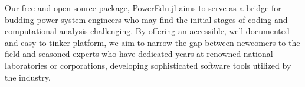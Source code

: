 \documentclass[varwidth]{standalone}
\providecommand{\packageName}[1]{PowerEdu.jl}
\begin{document}
Our free and open-source package, \packageName{} aims to serve as a
bridge for budding power system engineers who
may find the initial stages of coding and computational analysis challenging.
By offering an accessible, well-documented and easy to tinker platform, we
aim to narrow the gap between newcomers to the field and seasoned experts
who have dedicated years at renowned national laboratories or corporations,
developing sophisticated software tools utilized
by the industry.
\end{document}
